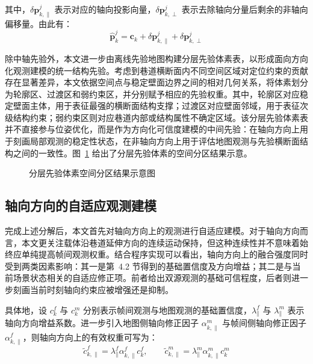 其中，$\delta \mathbf{p}_{k,\parallel}^{j}$ 表示对应的轴向投影向量，$\delta \mathbf{p}_{k,\perp}^{j}$ 表示去除轴向分量后剩余的非轴向偏移量。由此有：
\begin{equation}
\hat{\mathbf{p}}_{k}^{j}
=
\mathbf{c}_{k}
+\delta \mathbf{p}_{k,\parallel}^{j}
+\delta \mathbf{p}_{k,\perp}^{j}
\end{equation}

除中轴先验外，本文进一步由离线先验地图构建分层先验体素表，以形成面向方向化观测建模的统一结构先验。考虑到巷道横断面内不同空间区域对定位约束的贡献存在显著差异，本文依据空间点与稳定壁面边界之间的相对几何关系，将体素划分为轮廓区、过渡区和弱约束区，并分别赋予相应的先验权重。其中，轮廓区对应稳定壁面主体，用于表征最强的横断面结构支撑；过渡区对应壁面邻域，用于表征次级结构约束；弱约束区则对应巷道内部或结构属性不确定区域。该分层先验体素表并不直接参与位姿优化，而是作为方向化可信度建模的中间先验：在轴向方向上用于刻画局部观测的稳定性状态，在非轴向方向上用于评估地图观测与先验横断面结构之间的一致性。图~\ref{fig:ch4_prior_voxel_layer_generation} 给出了分层先验体素的空间分区结果示意。

\begin{figure}[htbp]
    \centering
    \caption{分层先验体素空间分区结果示意图}
    \label{fig:ch4_prior_voxel_layer_generation}
\end{figure}

\subsection{轴向方向的自适应观测建模}

完成上述分解后，本文首先对轴向方向上的观测进行自适应建模。对于轴向方向而言，本文更关注载体沿巷道延伸方向的连续运动保持，但这种连续性并不意味着始终应单纯提高帧间观测权重。结合程序实现可以看出，轴向方向上的融合强度同时受到两类因素影响：其一是第~4.2 节得到的基础置信度及方向增益；其二是与当前场景状态相关的自适应修正项。前者给出双源观测的基础可信程度，后者则进一步刻画当前时刻轴向约束应被增强还是抑制。

具体地，设 $c_{k}^{f}$ 与 $c_{k}^{m}$ 分别表示帧间观测与地图观测的基础置信度，$\lambda_{\parallel}^{f}$ 与 $\lambda_{\parallel}^{m}$ 表示轴向方向增益系数。进一步引入地图侧轴向修正因子 $\alpha_{k,\parallel}^{m}$ 与帧间侧轴向修正因子 $\alpha_{k,\parallel}^{f}$，则轴向方向上的有效权重可写为：
\begin{equation}
\tilde{c}_{k,\parallel}^{f}
=
\lambda_{\parallel}^{f}\alpha_{k,\parallel}^{f}c_{k}^{f},
\qquad
\tilde{c}_{k,\parallel}^{m}
=
\lambda_{\parallel}^{m}\alpha_{k,\parallel}^{m}c_{k}^{m}
\end{equation}

